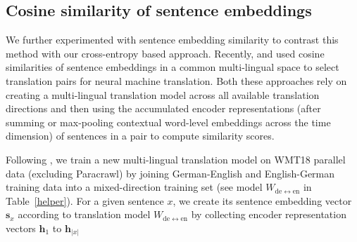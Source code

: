 \documentclass[11pt,a4paper]{article}
\begin{document}
\subsection{Cosine similarity of sentence embeddings}
We further experimented with sentence embedding similarity to contrast this method with our cross-entropy based approach. 
Recently,  and  used cosine similarities of sentence embeddings in a common multi-lingual space to select translation pairs for neural machine translation. Both these approaches rely on creating a multi-lingual translation model across all available translation directions and then using the accumulated encoder representations (after summing or max-pooling contextual word-level embeddings across the time dimension) of sentences in a pair to compute similarity scores.

Following , we train a new multi-lingual translation model on WMT18 parallel data (excluding Paracrawl) by joining German-English and English-German training data into a mixed-direction training set (see model $W_{\mathrm{de}\leftrightarrow\mathrm{en}}$ in Table~\ref{helper}). 
For a given sentence $x$, we create its sentence embedding vector $\mathbf{s}_x$ according to  translation model $W_{\mathrm{de}\leftrightarrow\mathrm{en}}$ by collecting encoder representation vectors $\mathbf{h}_1$ to $\mathbf{h}_{|x|}$
 
\end{document}
